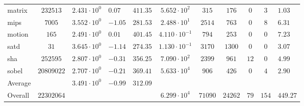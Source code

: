 \begin{tabular}{|l|c|HHc|c|c|c|c|cH|}
matrix        & $ 232513   $ & $ 2.431 \cdot 10^{0} $ & $ 0.07  $ & $ 411.35 $ & $ 5.652 \cdot 10^{2}  $ & $ 315   $ & $ 176   $ & $ 0   $ & $ 3   $ & $ 1.03    $ \\
mips          & $ 7005     $ & $ 3.552 \cdot 10^{0} $ & $ -1.05 $ & $ 281.53 $ & $ 2.488 \cdot 10^{1}  $ & $ 2514  $ & $ 763   $ & $ 0   $ & $ 8   $ & $ 6.31    $ \\
motion        & $ 165      $ & $ 2.491 \cdot 10^{0} $ & $ 0.01  $ & $ 401.45 $ & $ 4.110 \cdot 10^{-1} $ & $ 794   $ & $ 253   $ & $ 0   $ & $ 0   $ & $ 7.23    $ \\
satd          & $ 31       $ & $ 3.645 \cdot 10^{0} $ & $ -1.14 $ & $ 274.35 $ & $ 1.130 \cdot 10^{-1} $ & $ 3170  $ & $ 1300  $ & $ 0   $ & $ 0   $ & $ 3.07    $ \\
sha           & $ 252595   $ & $ 2.807 \cdot 10^{0} $ & $ -0.31 $ & $ 356.25 $ & $ 7.090 \cdot 10^{2}  $ & $ 2399  $ & $ 961   $ & $ 12  $ & $ 0   $ & $ 4.99    $ \\
sobel         & $ 20809022 $ & $ 2.707 \cdot 10^{0} $ & $ -0.21 $ & $ 369.41 $ & $ 5.633 \cdot 10^{4}  $ & $ 906   $ & $ 426   $ & $ 0   $ & $ 4   $ & $ 2.90    $ \\
\hline
Average       & $          $ & $ 3.491 \cdot 10^{0} $ & $ -0.99 $ & $ 312.09 $ & $                     $ & $       $ & $       $ & $     $ & $     $ & $         $ \\
\hline
Overall       & $ 22302064 $ & $                    $ & $       $ & $        $ & $ 6.299 \cdot 10^{4}  $ & $ 71090 $ & $ 24262 $ & $ 79  $ & $ 154 $ & $ 449.27  $ \\
\hline
\end{tabular}
